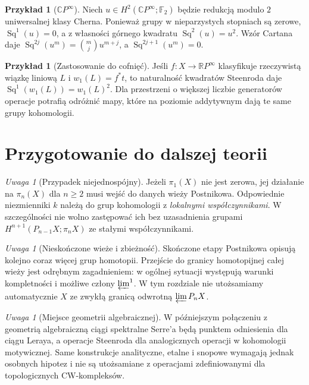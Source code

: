 \documentclass[11pt,a4paper,oneside]{report}
\newcommand{\F}{\mathbb{F}}
\newcommand{\R}{\mathbb{R}}
\newcommand{\C}{\mathbb{C}}
\theoremstyle{plain}
\theoremstyle{definition}
\newtheorem{przyklad}[twierdzenie]{Przykład}
\theoremstyle{remark}
\newtheorem{uwaga}[twierdzenie]{Uwaga}
\begin{document}
\begin{przyklad}[\texorpdfstring{$\C P^\infty$}{CP infinity}]
Niech $u\in H^2(\C P^\infty;\F_2)$ będzie redukcją
modulo $2$ uniwersalnej klasy Cherna. Ponieważ
grupy w nieparzystych stopniach są zerowe,
$\operatorname{Sq}^1(u)=0$, a z własności górnego
kwadratu $\operatorname{Sq}^2(u)=u^2$.
Wzór Cartana daje
$\operatorname{Sq}^{2j}(u^m)=\binom mj u^{m+j}$,
a $\operatorname{Sq}^{2j+1}(u^m)=0$.
\end{przyklad}

\begin{przyklad}[Zastosowanie do cofnięć]
Jeśli $f:X\to\R P^\infty$ klasyfikuje rzeczywistą
wiązkę liniową $L$ i $w_1(L)=f^*t$, to naturalność
kwadratów Steenroda daje
$\operatorname{Sq}^1(w_1(L))=w_1(L)^2$.
Dla przestrzeni o większej liczbie generatorów
operacje potrafią odróżnić mapy, które na poziomie
addytywnym dają te same grupy kohomologii.
\end{przyklad}

\section{Przygotowanie do dalszej teorii}
\begin{uwaga}[Przypadek niejednospójny]
Jeżeli $\pi_1(X)$ nie jest zerowa, jej działanie
na $\pi_n(X)$ dla $n\ge2$ musi wejść do danych
wieży Postnikowa. Odpowiednie niezmienniki $k$
należą do grup kohomologii z \emph{lokalnymi
współczynnikami}. W szczególności nie wolno
zastępować ich bez uzasadnienia grupami
$H^{n+1}(P_{n-1}X;\pi_nX)$ ze stałymi współczynnikami.
\end{uwaga}

\begin{uwaga}[Nieskończone wieże i zbieżność]
Skończone etapy Postnikowa opisują kolejno coraz
więcej grup homotopii. Przejście do granicy
homotopijnej całej wieży jest odrębnym zagadnieniem:
w ogólnej sytuacji występują warunki kompletności
i możliwe człony $\varprojlim^1$. W tym rozdziale
nie utożsamiamy automatycznie $X$ ze zwykłą
granicą odwrotną $\varprojlim P_nX$.
\end{uwaga}

\begin{uwaga}[Miejsce geometrii algebraicznej]
W późniejszym połączeniu z geometrią algebraiczną
ciągi spektralne Serre'a będą punktem odniesienia
dla ciągu Leraya, a operacje Steenroda dla analogicznych
operacji w kohomologii motywicznej. Same
konstrukcje analityczne, etalne i snopowe wymagają
jednak osobnych hipotez i nie są utożsamiane z
operacjami zdefiniowanymi dla topologicznych
CW-kompleksów.
\end{uwaga}
\end{document}
